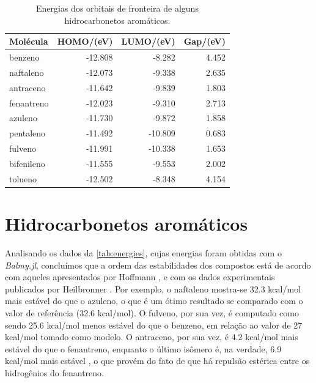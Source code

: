 \begin{table}[htb]
	\centering
	\caption{\label{tab:gapsO} Energias dos orbitais de fronteira de alguns hidrocarbonetos aromáticos.}	
	\begin{tabular}{lrrr}
		\toprule
		\textbf{Molécula} & \textbf{HOMO/(eV)} & \textbf{LUMO/(eV)} & \textbf{Gap/(eV)}
		\\ 
		\midrule
        benzeno & -12.808 & -8.282 & 4.452 \\
        naftaleno & -12.073 & -9.338 & 2.635 \\
        antraceno & -11.642 & -9.839 & 1.803 \\
        fenantreno & -12.023 & -9.310 & 2.713 \\
        azuleno & -11.730 & -9.872 & 1.858 \\
        pentaleno & -11.492 & -10.809 & 0.683 \\
        fulveno & -11.991 & -10.338 & 1.653 \\
        bifenileno & -11.555 & -9.553 & 2.002 \\
        tolueno & -12.502 & -8.348 & 4.154 \\
    \bottomrule
	\end{tabular}
\end{table}

\section{Hidrocarbonetos aromáticos}

Analisando os dados da \autoref{tab:energies}, cujas energias foram obtidas com o \textit{Balmy.jl}, concluímos que a ordem das estabilidades dos compostos está de acordo com aqueles apresentados por Hoffmann \autocite{Hoffmann1963}, e com os dados experimentais publicados por Heilbronner \autocite{ginsburg1959}. Por exemplo, o naftaleno mostra-se 32.3 kcal/mol mais estável do que o azuleno, o que é um ótimo resultado se comparado com o valor de referência (32.6 kcal/mol)\autocite{ginsburg1959}. O fulveno, por sua vez, é computado como sendo 25.6 kcal/mol menos estável do que o benzeno, em relação ao valor de 27 kcal/mol tomado como modelo\autocite{CHENG1956}. O antraceno, por sua vez, é 4.2 kcal/mol mais estável do que o fenantreno, enquanto o último isômero é, na verdade, 6.9 kcal/mol mais estável \autocite{Hoffmann1963}, o que provém do fato de que há repulsão estérica entre os hidrogênios do fenantreno.


